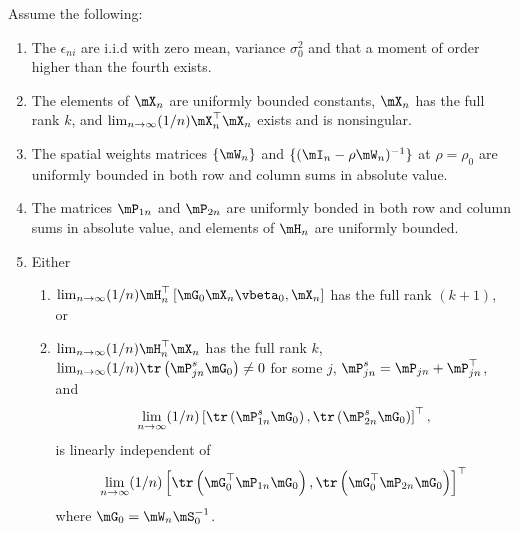 \begin{assumption}\label{assumption:lee2007-1}
Assume the following:
\begin{enumerate}
  \item The $\epsilon_{ni}$ are i.i.d with zero mean, variance $\sigma_0^2$ and that a moment of order higher than the fourth exists. 
  \item The elements of $\mX_n$ are uniformly bounded constants, $\mX_n$ has the full rank $k$, and $\lim_{n\to\infty}(1/n)\mX_n^\top\mX_n$ exists and is nonsingular. 
  \item The spatial weights matrices $\{\mW_n\}$ and $\{(\mI_n - \rho\mW_n)^{-1}\}$ at $\rho = \rho_0$ are uniformly bounded in both row and column sums in absolute value.
  \item The matrices $\mP_{1n}$ and $\mP_{2n}$ are uniformly bonded in both row and column sums in absolute value, and elements of $\mH_n$ are uniformly bounded. 
  \item Either 
  \begin{enumerate}
    \item $\lim_{n\to\infty}(1/n)\mH_n^\top\left[\mG_0\mX_n\vbeta_0, \mX_n\right]$ has the full rank $(k + 1)$, or
    \item $\lim_{n\to\infty}(1/n)\mH_n^\top\mX_n$ has the full rank $k$, $\lim_{n\to\infty}(1/n)\tr\left(\mP_{jn}^s\mG_0\right)\neq 0$ for some $j$, $\mP_{jn}^s = \mP_{jn} + \mP_{jn}^\top$, and 
    \begin{equation*}
      \lim_{n\to\infty}(1/n)\left[\tr\left(\mP_{1n}^s\mG_0\right), \tr\left(\mP_{2n}^s\mG_0\right)\right]^\top, 
    \end{equation*}
    is linearly independent of 
    \begin{equation*}
    \begin{aligned}
    \lim_{n\to\infty}(1/n)\left[\tr\left(\mG_0^\top\mP_{1n}\mG_0\right), \tr\left(\mG_0^\top\mP_{2n}\mG_0\right)\right]^\top
    \end{aligned}
    \end{equation*}
  where $\mG_0 = \mW_n\mS_0^{-1}$.
  \end{enumerate}
\end{enumerate}
\end{assumption}

